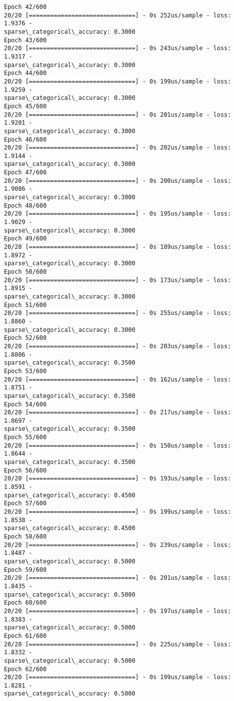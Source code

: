 \documentclass[11pt]{article}
\begin{document}
\begin{Verbatim}[commandchars=\\\{\}]
Epoch 42/600
20/20 [==============================] - 0s 252us/sample - loss: 1.9376 -
sparse\_categorical\_accuracy: 0.3000
Epoch 43/600
20/20 [==============================] - 0s 243us/sample - loss: 1.9317 -
sparse\_categorical\_accuracy: 0.3000
Epoch 44/600
20/20 [==============================] - 0s 199us/sample - loss: 1.9259 -
sparse\_categorical\_accuracy: 0.3000
Epoch 45/600
20/20 [==============================] - 0s 201us/sample - loss: 1.9201 -
sparse\_categorical\_accuracy: 0.3000
Epoch 46/600
20/20 [==============================] - 0s 202us/sample - loss: 1.9144 -
sparse\_categorical\_accuracy: 0.3000
Epoch 47/600
20/20 [==============================] - 0s 200us/sample - loss: 1.9086 -
sparse\_categorical\_accuracy: 0.3000
Epoch 48/600
20/20 [==============================] - 0s 195us/sample - loss: 1.9029 -
sparse\_categorical\_accuracy: 0.3000
Epoch 49/600
20/20 [==============================] - 0s 189us/sample - loss: 1.8972 -
sparse\_categorical\_accuracy: 0.3000
Epoch 50/600
20/20 [==============================] - 0s 173us/sample - loss: 1.8915 -
sparse\_categorical\_accuracy: 0.3000
Epoch 51/600
20/20 [==============================] - 0s 255us/sample - loss: 1.8860 -
sparse\_categorical\_accuracy: 0.3000
Epoch 52/600
20/20 [==============================] - 0s 203us/sample - loss: 1.8806 -
sparse\_categorical\_accuracy: 0.3500
Epoch 53/600
20/20 [==============================] - 0s 162us/sample - loss: 1.8751 -
sparse\_categorical\_accuracy: 0.3500
Epoch 54/600
20/20 [==============================] - 0s 217us/sample - loss: 1.8697 -
sparse\_categorical\_accuracy: 0.3500
Epoch 55/600
20/20 [==============================] - 0s 150us/sample - loss: 1.8644 -
sparse\_categorical\_accuracy: 0.3500
Epoch 56/600
20/20 [==============================] - 0s 193us/sample - loss: 1.8591 -
sparse\_categorical\_accuracy: 0.4500
Epoch 57/600
20/20 [==============================] - 0s 199us/sample - loss: 1.8538 -
sparse\_categorical\_accuracy: 0.4500
Epoch 58/600
20/20 [==============================] - 0s 239us/sample - loss: 1.8487 -
sparse\_categorical\_accuracy: 0.5000
Epoch 59/600
20/20 [==============================] - 0s 201us/sample - loss: 1.8435 -
sparse\_categorical\_accuracy: 0.5000
Epoch 60/600
20/20 [==============================] - 0s 197us/sample - loss: 1.8383 -
sparse\_categorical\_accuracy: 0.5000
Epoch 61/600
20/20 [==============================] - 0s 225us/sample - loss: 1.8332 -
sparse\_categorical\_accuracy: 0.5000
Epoch 62/600
20/20 [==============================] - 0s 199us/sample - loss: 1.8281 -
sparse\_categorical\_accuracy: 0.5000

\end{Verbatim}
\end{document}
